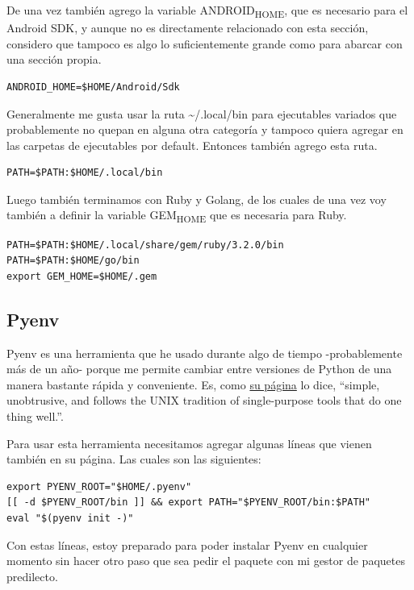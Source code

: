 \documentclass[11pt]{article}
\begin{document}
De una vez también agrego la variable ANDROID\textsubscript{HOME}, que es necesario para el Android SDK, y aunque no es directamente relacionado con esta sección, considero que tampoco es algo lo suficientemente grande como para abarcar con una sección propia.

\begin{verbatim}
ANDROID_HOME=$HOME/Android/Sdk
\end{verbatim}

Generalmente me gusta usar la ruta \textasciitilde{}/.local/bin para ejecutables variados que probablemente no quepan en alguna otra categoría y tampoco quiera agregar en las carpetas de ejecutables por default. Entonces también agrego esta ruta.

\begin{verbatim}
PATH=$PATH:$HOME/.local/bin
\end{verbatim}

Luego también terminamos con Ruby y Golang, de los cuales de una vez voy también a definir la variable GEM\textsubscript{HOME} que es necesaria para Ruby.

\begin{verbatim}
PATH=$PATH:$HOME/.local/share/gem/ruby/3.2.0/bin
PATH=$PATH:$HOME/go/bin
export GEM_HOME=$HOME/.gem

\end{verbatim}
\subsection{Pyenv}
\label{sec:orgcfff6cc}

Pyenv es una herramienta que he usado durante algo de tiempo -probablemente más de un año- porque me permite cambiar entre versiones de Python de una manera bastante rápida y conveniente. Es, como \href{https://github.com/pyenv/pyenv}{su página} lo dice, ``simple, unobtrusive, and follows the UNIX tradition of single-purpose tools that do one thing well.''.

Para usar esta herramienta necesitamos agregar algunas líneas que vienen también en su página. Las cuales son las siguientes:

\begin{verbatim}
export PYENV_ROOT="$HOME/.pyenv"
[[ -d $PYENV_ROOT/bin ]] && export PATH="$PYENV_ROOT/bin:$PATH"
eval "$(pyenv init -)"
\end{verbatim}

Con estas líneas, estoy preparado para poder instalar Pyenv en cualquier momento sin hacer otro paso que sea pedir el paquete con mi gestor de paquetes predilecto.
\end{document}

